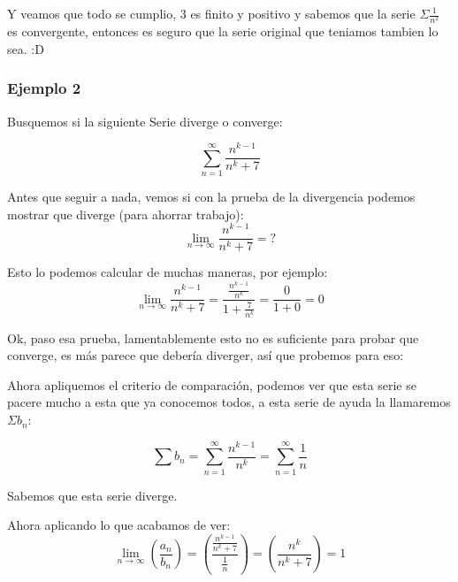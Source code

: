 \documentclass[12pt]{report}                                %
\begin{document}
            Y veamos que todo se cumplio, 3 es finito y positivo y sabemos que la serie $\Sigma \frac{1}{n^2}$ es convergente, entonces es seguro que la serie original que teniamos tambien lo sea. :D


        \subsubsection{Ejemplo 2}
            Busquemos si la siguiente Serie diverge o converge:

            \begin{equation*}
                \sum_{n=1}^{\infty} \frac{n^{k-1}}{n^k+7}
            \end{equation*}
             
            Antes que seguir a nada, vemos si con la prueba de la divergencia podemos mostrar que diverge (para ahorrar trabajo):
            \begin{equation*}
                \lim_{n \to \infty} \frac{n^{k-1}}{n^k+7} = ?
            \end{equation*}

            Esto lo podemos calcular de muchas maneras, por ejemplo:
            \begin{equation*}
                \lim_{n \to \infty} \frac{n^{k-1}}{n^k+7} = \frac{ \frac{n^{k-1}}{n^k} }{1+\frac{7}{n^k}} = \frac{0}{1+0} = 0
            \end{equation*}

            Ok, paso esa prueba, lamentablemente esto no es suficiente para probar que converge, es más parece que debería diverger, así que probemos para eso:

            Ahora apliquemos el criterio de comparación, podemos ver que esta serie se pacere mucho a esta que ya conocemos todos, a esta serie de ayuda la llamaremos $\Sigma b_n$:

            \begin{equation*}
                \sum b_n = \sum_{n=1}^{\infty} \frac{n^{k-1}}{n^k} = \sum_{n=1}^{\infty} \frac{1}{n}
            \end{equation*}

            Sabemos que esta serie diverge.

            Ahora aplicando lo que acabamos de ver:
            \begin{equation*}
                \lim_{n \to \infty} \left( \frac{a_n}{b_n} \right) = \left( \frac{ \frac{n^{k-1}}{n^k+7} }{ \frac{1}{n} } \right) =  \left( \frac{n^k}{n^k+7} \right) = 1
            \end{equation*}
\end{document}
